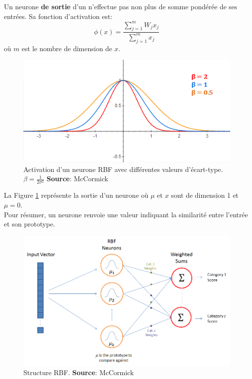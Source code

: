 Un neurone \textbf{de sortie} d'un \rbf n'effectue pas non plus de somme pondérée de ses entrées. Sa fonction d'activation est:
\[\phi(x) = \frac{\sum_{j=1}^{m}W_{j}x_{j}}{\sum_{j=1}^{m}x_{j}}\]%
où $m$ est le nombre de dimension de $x$.
\begin{figure}
 \centering
 \includegraphics[scale=0.7]{../figures/RBFactivation.png}%
 \caption{Activation d'un neurone RBF avec différentes valeurs d'écart-type. $\beta=\frac{1}{2\sigma^2}$ \textbf{Source}: McCormick\cite{RBFtuto}}
 \label{rbfactivation}
\end{figure}
La Figure \ref{rbfactivation} représente la sortie d'un neurone \rbf où $\mu$ et $x$ sont de dimension 1 et $\mu = 0$.\\
Pour résumer, un neurone \rbf renvoie une valeur indiquant la similarité entre l'entrée et son prototype.
\begin{figure}
 \centering
 \includegraphics[scale=0.5]{../figures/RBFstruct.png}
 \caption{Structure RBF. \textbf{Source}: McCormick\cite{RBFtuto}}
 \label{structurerbf}
\end{figure}

